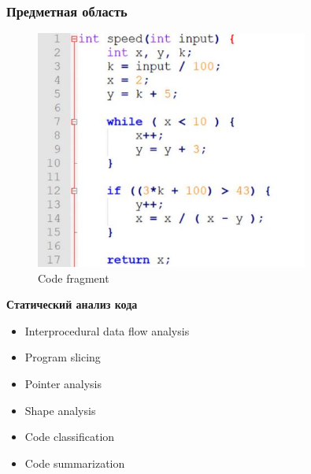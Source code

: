 \documentclass[xcolor=table,english]{beamer}
\begin{document}
\begin{frame}[fragile] \frametitle{Предметная область}
    \begin{minipage}[m]{0.45\linewidth}
        \begin{figure}
            \centering
            \includegraphics[width=0.8\textwidth]{figures/static_code_analysis.jpg}
            \caption{Code fragment}
            \label{fig:code_fragment}
        \end{figure}
    \end{minipage}\hfill
    \begin{minipage}[m]{0.55\linewidth}
        \textbf{Статический анализ кода}
        \begin{itemize}
            \item Interprocedural data flow analysis
            \item Program slicing
            \item Pointer  analysis
            \item Shape analysis
            \item Code classification
            \item Code summarization
        \end{itemize}
    \end{minipage}
\end{frame}
\end{document}
